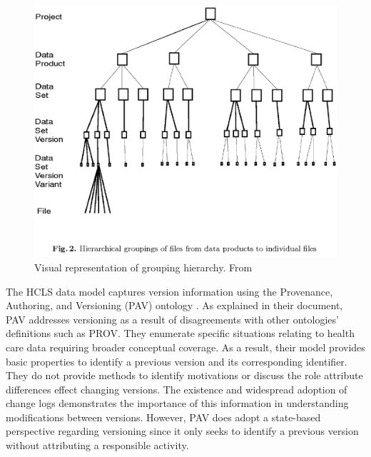 \begin{figure}
	\centering
	\includegraphics[scale=0.50]{figures/hierarchy.png}
	\caption[Visual representation of grouping hierarchy.]{Visual representation of grouping hierarchy.  From \cite{Barkstrom2003}}
	\label{hierarchy}
\end{figure}

The HCLS data model captures version information using the Provenance, Authoring, and Versioning (PAV) ontology \cite{Ciccarese2013}.
As explained in their document, PAV addresses versioning as a result of disagreements with other ontologies' definitions such as PROV.
They enumerate specific situations relating to health care data requiring broader conceptual coverage.
As a result, their model provides basic properties to identify a previous version and its corresponding identifier.
They do not provide methods to identify motivations or discuss the role attribute differences effect changing versions.
The existence and widespread adoption of change logs demonstrates the importance of this information in understanding modifications between versions.
However, PAV does adopt a state-based perspective regarding versioning since it only seeks to identify a previous version without attributing a responsible activity.

